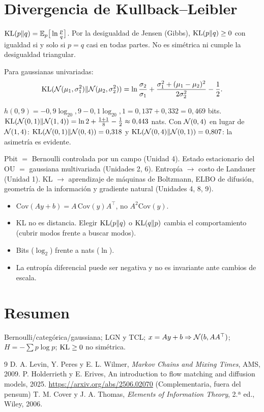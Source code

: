 \documentclass[11pt,a4paper]{article}
\begin{document}
\section{Divergencia de Kullback--Leibler}
\begin{definicion}[ (KL)]
$\operatorname{KL}(p\|q)=\mathbb{E}_p\big[\ln\frac{p}{q}\big]$. Por la desigualdad de Jensen (Gibbs), $\operatorname{KL}(p\|q)\ge0$ con igualdad
si y solo si $p=q$ casi en todas partes. No es simétrica ni cumple la desigualdad triangular.
\end{definicion}
Para gaussianas univariadas:
\[\operatorname{KL}(\mathcal{N}(\mu_1,\sigma_1^2)\|\mathcal{N}(\mu_2,\sigma_2^2))=\ln\frac{\sigma_2}{\sigma_1}+\frac{\sigma_1^2+(\mu_1-\mu_2)^2}{2\sigma_2^2}-\frac12.\]
\begin{ejemplo}
$h(0{,}9)=-0{,}9\log_20{,}9-0{,}1\log_20{,}1=0{,}137+0{,}332=0{,}469$ bits.
$\operatorname{KL}(\mathcal{N}(0,1)\|\mathcal{N}(1,4))=\ln2+\frac{1+1}{8}-\frac12\approx0{,}443$ nats. Con $\mathcal{N}(0,4)$ en lugar de $\mathcal{N}(1,4)$:
$\operatorname{KL}(\mathcal{N}(0,1)\|\mathcal{N}(0,4))=0{,}318$ y $\operatorname{KL}(\mathcal{N}(0,4)\|\mathcal{N}(0,1))=0{,}807$: la asimetría es evidente.
\end{ejemplo}

\begin{aplicacion}
Pbit $=$ Bernoulli controlada por un campo (Unidad 4). Estado estacionario del OU $=$ gaussiana
multivariada (Unidades 2, 6). Entropía $\to$ costo de Landauer (Unidad 1). KL $\to$ aprendizaje de máquinas
de Boltzmann, ELBO de difusión, geometría de la información y gradiente natural (Unidades 4, 8, 9).
\end{aplicacion}

\begin{error}
\begin{itemize}[nosep]
\item $\mathrm{Cov}(Ay+b)=A\,\mathrm{Cov}(y)A^\top$, no $A^2\mathrm{Cov}(y)$.
\item KL no es distancia. Elegir $\operatorname{KL}(p\|q)$ o $\operatorname{KL}(q\|p)$ cambia el comportamiento (cubrir modos frente a buscar modos).
\item Bits ($\log_2$) frente a nats ($\ln$).
\item La entropía diferencial puede ser negativa y no es invariante ante cambios de escala.
\end{itemize}
\end{error}

\section{Resumen}
Bernoulli/categórica/gaussiana; LGN y TCL; $x=Ay+b\Rightarrow\mathcal{N}(b,AA^\top)$; $H=-\sum p\log p$; $\operatorname{KL}\ge0$ no simétrica.

\begin{thebibliography}{9}\small
{} D. A. Levin, Y. Peres y E. L. Wilmer, \emph{Markov Chains and Mixing Times}, AMS, 2009.
 P. Holderrieth y E. Erives, An introduction to flow matching and diffusion models, 2025. \url{https://arxiv.org/abs/2506.02070}
 (Complementaria, fuera del pensum) T. M. Cover y J. A. Thomas, \emph{Elements of Information Theory}, 2.ª ed., Wiley, 2006.
\end{thebibliography}
\end{document}
